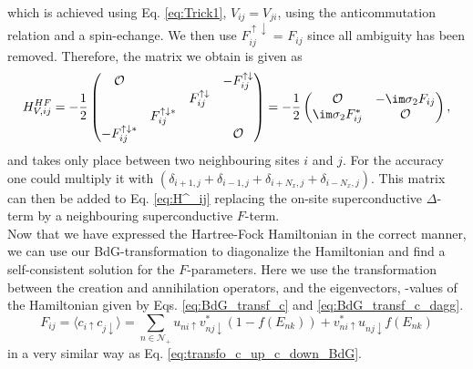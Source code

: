 \documentclass[../main.tex]{subfile}
\begin{document}
which is achieved using Eq. \ref{eq:Trick1}, $V_{ij} = {V_{ji}}$, 
using the anticommutation relation and a spin-echange. We then use $F_{ij}^{\uparrow \downarrow}$ = $F_{ij}$ since all ambiguity has been removed.
Therefore, the matrix we obtain is given as
\begin{equation}\label{eq:H_V_DWave}
    H_{V,ij}^{HF} = -\frac{1}{2}\begin{pmatrix}
        \mathcal{O} & & & -F_{ij}^{\uparrow \downarrow}\\
         & & F_{ij}^{\uparrow \downarrow} & \\
         & F_{ij}^{\uparrow \downarrow\ast}& & \\
         -F_{ij}^{\uparrow \downarrow\ast} & & & \mathcal{O}\\
    \end{pmatrix} = -\frac{1}{2}\begin{pmatrix}
        \mathcal{O} & -\im \sigma_2 F_{ij}\\
        \im \sigma_2 F_{ij}^{\ast} & \mathcal{O}
    \end{pmatrix},
\end{equation}
and takes only place between two neighbouring sites $i$ and $j$. For the accuracy one could multiply it with 
$(\delta_{i+1,j} + \delta_{i-1,j} + \delta_{i+N_x,j} + \delta_{i-N_x,j})$. This matrix can then be added to Eq. \ref{eq:H^_ij} replacing the on-site superconductive $\Delta$-term by
a neighbouring superconductive $F$-term.\\

Now that we have expressed the Hartree-Fock Hamiltonian in the correct manner, we can use our BdG-transformation to diagonalize the Hamiltonian and find a self-consistent solution 
for the $F$-parameters. Here we use the transformation between the creation and annihilation operators, and the eigenvectors, -values of the Hamiltonian given by Eqs. \ref{eq:BdG_transf_c} 
and \ref{eq:BdG_transf_c_dagg}. 
\begin{equation}
    F_{ij} = \langle c_{i\uparrow}c_{j\downarrow}\rangle = \sum_{n\in \mathcal{N}_+} u_{ni\uparrow}v_{nj\downarrow}^{\ast}\left(1 - f(E_{nk})\right) + v_{ni\uparrow}^{\ast}u_{nj\downarrow}f(E_{nk})
\end{equation}
in a very similar way as Eq. \ref{eq:transfo_c_up_c_down_BdG}.
\end{document}
